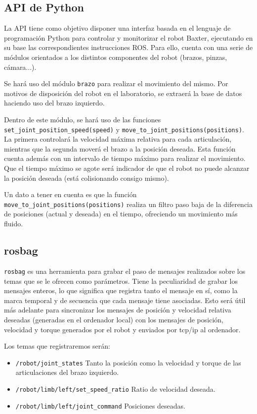 \subsection{API de Python}
La API tiene como objetivo disponer una interfaz basada en el lenguaje de programación Python para controlar y monitorizar el robot Baxter, ejecutando en su base las correspondientes instrucciones ROS. Para ello, cuenta con una serie de módulos orientados a los distintos componentes del robot (brazos, pinzas, cámara...).

Se hará uso del módulo \verb|brazo| para realizar el movimiento del mismo. Por motivos de disposición del robot en el laboratorio, se extraerá la base de datos haciendo uso del brazo izquierdo.

Dentro de este módulo, se hará uso de las funciones \verb|set_joint_position_speed(speed)| y \verb|move_to_joint_positions(positions)|. La primera controlará la velocidad máxima relativa para cada articulación, mientras que la segunda moverá el brazo a la posición deseada. Esta función cuenta además con un intervalo de tiempo máximo para realizar el movimiento. Que el tiempo máximo se agote será indicador de que el robot no puede alcanzar la posición deseada (está colisionando consigo mismo).

Un dato a tener en cuenta es que la función \verb|move_to_joint_positions(positions)| realiza un filtro paso baja de la diferencia de posiciones (actual y deseada) en el tiempo, ofreciendo un movimiento más fluido.

\subsection{rosbag}
\verb|rosbag| es una herramienta para grabar el paso de mensajes realizados sobre los temas que se le ofrecen como parámetros. Tiene la peculiaridad de grabar los mensajes enteros, lo que significa que registra tanto el mensaje en sí, como la marca temporal y de secuencia que cada mensaje tiene asociadas. Esto será útil más adelante para sincronizar los mensajes de posición y velocidad relativa deseadas (generadas en el ordenador local) con los mensajes de posición, velocidad y torque generados por el robot y enviados por tcp/ip al ordenador.

Los temas que registraremos serán:

\begin{itemize}
\item \verb|/robot/joint_states| Tanto la posición como la velocidad y torque de las articulaciones del brazo izquierdo.
\item \verb|/robot/limb/left/set_speed_ratio| Ratio de velocidad deseada.
\item \verb|/robot/limb/left/joint_command| Posiciones deseadas.
\end{itemize}

